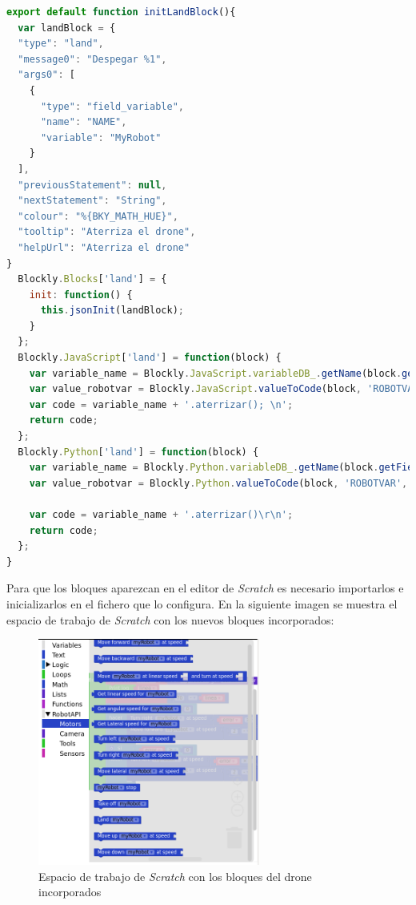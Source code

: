 \begin{lstlisting}[language=javascript,label=list:traduccion]
export default function initLandBlock(){
  var landBlock = {
  "type": "land",
  "message0": "Despegar %1",
  "args0": [
    {
      "type": "field_variable",
      "name": "NAME",
      "variable": "MyRobot"
    }
  ],
  "previousStatement": null,
  "nextStatement": "String",
  "colour": "%{BKY_MATH_HUE}",
  "tooltip": "Aterriza el drone",
  "helpUrl": "Aterriza el drone"
}
  Blockly.Blocks['land'] = {
    init: function() {
      this.jsonInit(landBlock);
    }
  };
  Blockly.JavaScript['land'] = function(block) {
    var variable_name = Blockly.JavaScript.variableDB_.getName(block.getFieldValue('NAME'), Blockly.Variables.NAME_TYPE);
    var value_robotvar = Blockly.JavaScript.valueToCode(block, 'ROBOTVAR', Blockly.JavaScript.ORDER_ATOMIC);
    var code = variable_name + '.aterrizar(); \n';
    return code;
  };
  Blockly.Python['land'] = function(block) {
    var variable_name = Blockly.Python.variableDB_.getName(block.getFieldValue('NAME'), Blockly.Variables.NAME_TYPE);
    var value_robotvar = Blockly.Python.valueToCode(block, 'ROBOTVAR', Blockly.Python.ORDER_ATOMIC);

    var code = variable_name + '.aterrizar()\r\n';
    return code;
  };
}
\end{lstlisting}

Para que los bloques aparezcan en el editor de \textit{Scratch} es necesario importarlos e inicializarlos en el fichero que lo configura. En la siguiente imagen se muestra el espacio de trabajo de \textit{Scratch} con los nuevos bloques incorporados:

\begin{figure}[H]
    \centering            \includegraphics[width=0.65\textwidth]{img/kibotics_newblocks.png}
    \caption{Espacio de trabajo de \textit{Scratch} con los bloques del drone incorporados} 
    \label{fig:newblocks}
\end{figure}

